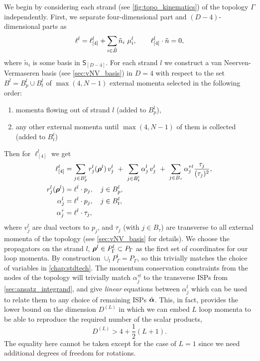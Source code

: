 We begin by considering each strand (see \cref{fig:topo_kinematics}) of the topology $\Gamma$ independently.
First, we separate four-dimensional part and $(D-4)$-dimensional parts as
\begin{equation}
  \ell^l = \ell_{[4]}^l + \sum_{i\in \tilde{B}} \tilde{n}_i~\mu^l_{i}, \qquad \sp(\ell^l_{[4]},\tilde{n}) = 0, 
\end{equation}
where $\tilde{n}_i$ is some basis in $\mathsf{S}_{[D-4]}$.
For each strand $l$ we construct a van Neerven-Vermaseren basis (see \cref{sec:vNV_basis})
in $D=4$ with respect to the set $B^l = B^l_p \cup B^l_t$ of $\max(4,N-1)$ external momenta selected in the following order:
\begin{enumerate}
  \item momenta flowing out of strand $l$ (added to $B^l_p$),
  \item any other external momenta until $\max(4,N-1)$ of them is collected (added to $B^l_t$)
\end{enumerate}
Then for $\ell^l_{[4]}$ we get
\begin{subequations}
  \label{eq:lparametrization}
  \begin{align}
    \ell^l_{[4]} &= \sum_{j\in B^l_p} r^l_j(\vb*{\rho}^l)\,v^l_j ~+~ \sum_{j\in B^l_t} \alpha^l_j\,v^l_j ~+~\sum_{j\in B_\tau} \alpha^{\tau l}_j \frac{\tau_j}{(\tau_j)^2}, \\
    \label{eq:lparametrization_b}
    r_j^l(\vb*{\rho}^l) &=  \sp(\ell^l, p_j), \quad j\in B^l_p,    \\ 
    \label{eq:lparametrization_c}
    \alpha_j^l &=  \sp(\ell^l, p_j),\quad j\in B^l_t, \\
    \label{eq:lparametrization_d}
    \alpha_j^\tau &=  \sp(\ell^l, \tau_j),
  \end{align}
\end{subequations}
where $v^l_j$ are dual vectors to $p_j$, and $\tau_j$ (with $j \in B_{\tau}$) are transverse to all external momenta of the topology (see \cref{sec:vNV_basis} for details).
We choose the propagators on the strand $l$, $\vb*{\rho}^l \in P_\Gamma^l \subset P_\Gamma$
as the first set of coordinates for our loop momenta. By construction $\cup_l P_\Gamma^l = P_\Gamma$,
so this trivially matches the choice of variables in \cref{chap:stdtech}.
The momentum conservation constraints from the nodes of the topology will
trivially match $\alpha_j^{\tau l}$ to the transverse ISPs from \cref{sec:ansatz_integrand},
and give \emph{linear} equations between $\alpha_j^l$ which can be used to
relate them to any choice of remaining ISPs $\hat{\vb*{\alpha}}$.
This, in fact, provides the lower bound on the dimension $D^{(L)}$ in which we can embed $L$ loop momenta
to be able to reproduce the required number of the scalar products,
\begin{equation}
  D^{(L)}  >  4 +\frac{1}{2}(L+1).
\end{equation}
The equality here cannot be taken except for the case of $L=1$ since we need additional degrees of freedom for rotations.

